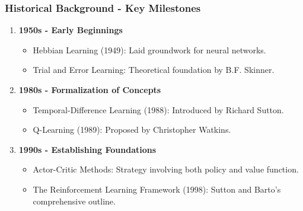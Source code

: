 \documentclass[aspectratio=169]{beamer}
\begin{document}
\begin{frame}[fragile]
    \frametitle{Historical Background - Key Milestones}
    \begin{enumerate}
        \item \textbf{1950s - Early Beginnings}
            \begin{itemize}
                \item Hebbian Learning (1949): Laid groundwork for neural networks.
                \item Trial and Error Learning: Theoretical foundation by B.F. Skinner.
            \end{itemize}
        
        \item \textbf{1980s - Formalization of Concepts}
            \begin{itemize}
                \item Temporal-Difference Learning (1988): Introduced by Richard Sutton.
                \item Q-Learning (1989): Proposed by Christopher Watkins.
            \end{itemize}
        
        \item \textbf{1990s - Establishing Foundations}
            \begin{itemize}
                \item Actor-Critic Methods: Strategy involving both policy and value function.
                \item The Reinforcement Learning Framework (1998): Sutton and Barto's comprehensive outline.
            \end{itemize}
    \end{enumerate}
\end{frame}
\end{document}
